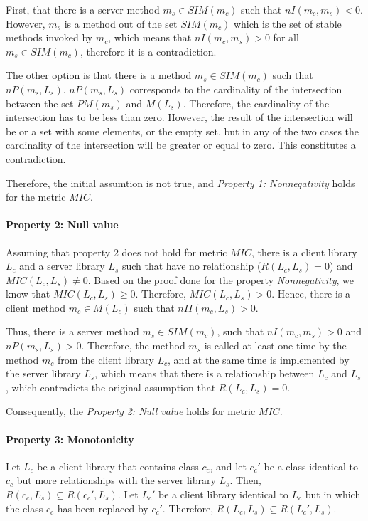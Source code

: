 First, that there is a server method $m_s \in SIM(m_c)$ such that $nI(m_c, m_s) < 0$. However, $m_s$ is a method out of the set $SIM(m_c)$ which is the set of stable methods invoked by $m_c$, which means that $nI(m_c, m_s) > 0$ for all $m_s \in SIM(m_c)$, therefore it is a contradiction.

The other option is that there is a method $m_s \in SIM(m_c)$ such that $nP(m_s, L_s)$. $nP(m_s, L_s)$ corresponds to the cardinality of the intersection between the set $PM(m_s)$ and $M(L_s)$. Therefore, the cardinality of the intersection has to be less than zero. However, the result of the intersection will be or a set with some elements, or the empty set, but in any of the two cases the cardinality of the intersection will be greater or equal to zero. This constitutes a contradiction.

Therefore, the initial assumtion is not true, and \textit{Property 1: Nonnegativity} holds for the metric $MIC$.

\paragraph{Property 2: Null value}
Assuming that property 2 does not hold for metric $MIC$, there is a client library $L_c$ and a server library $L_s$ such that have no relationship ($R(L_c, L_s) = 0$) and $MIC(L_c, L_s)	\neq 0$. Based on the proof done for the property \textit{Nonnegativity}, we know that $MIC(L_c, L_s) \ge 0$. Therefore, $MIC(L_c, L_s) > 0$. Hence, there is a client method $m_c \in M(L_c)$ such that $nII(m_c, L_s) > 0$.

Thus, there is a server method $m_s \in SIM(m_c)$, such that $nI(m_c, m_s) > 0$ and $nP(m_s, L_s) > 0$. Therefore, the method $m_s$ is called at least one time by the method $m_c$ from the client library $L_c$, and at the same time is implemented by the server library $L_s$, which means that there is a relationship between $L_c$ and $L_s$, which contradicts the original assumption that $R(L_c, L_s) = 0$.

Consequently, the \textit{Property 2: Null value} holds for metric $MIC$.

\paragraph{Property 3: Monotonicity}
Let $L_c$ be a client library that contains class $c_c$, and let $c_c'$ be a class identical to $c_c$ but more relationships with the server library $L_s$. Then, $R(c_c, L_s) \subseteq R(c_c', L_s)$. Let $L_c'$ be a client library identical to $L_c$ but in which the class $c_c$ has been replaced by $c_c'$. Therefore, $R(L_c, L_s) \subseteq R(L_c', L_s)$.

